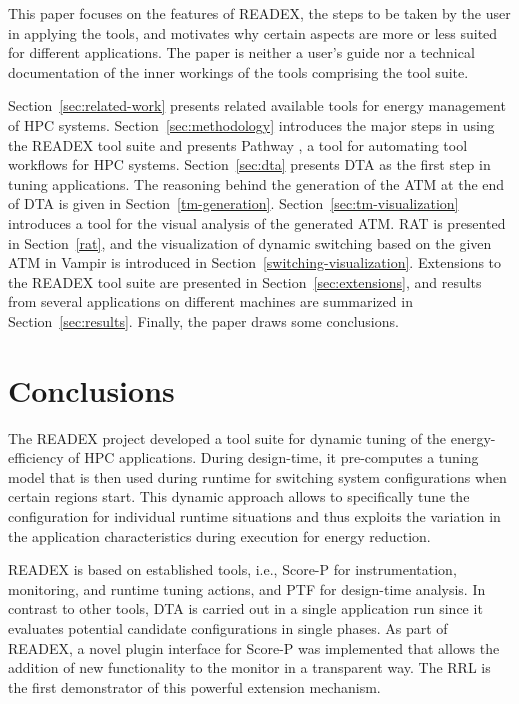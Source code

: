\documentclass[runningheads]{llncs}
\begin{document}
This paper focuses on the features of READEX, the steps to be taken by the user in applying the tools, and motivates why certain aspects are more or less suited for different applications. The paper is neither a user's guide nor a technical documentation of the inner workings of the tools comprising the tool suite. 

Section~\ref{sec:related-work} presents related available tools for energy management of HPC systems. Section~\ref{sec:methodology} introduces the major steps in using the READEX tool suite and presents Pathway \cite{Pathway:Petkov13}, a tool for automating tool workflows for HPC systems. Section~\ref{sec:dta} presents DTA as the first step in tuning applications. The reasoning behind the generation of the ATM at the end of DTA is given in Section~\ref{tm-generation}. Section~\ref{sec:tm-visualization} introduces a tool for the visual analysis of the generated ATM. RAT is presented in Section~\ref{rat}, and the visualization of dynamic switching based on the given ATM in Vampir is introduced in Section~\ref{switching-visualization}. Extensions to the READEX tool suite are presented in Section~\ref{sec:extensions}, and results from several applications on different machines are summarized in Section~\ref{sec:results}. Finally, the paper draws some conclusions. 


















\section{Conclusions} \label{sec:conclusions}

The READEX project developed a tool suite for dynamic tuning of the energy-efficiency of HPC applications. During design-time, it pre-computes a tuning model that is then used during runtime for switching system configurations when certain regions start. This dynamic approach allows to specifically tune the configuration for individual runtime situations and thus exploits the variation in the application characteristics during execution for energy reduction. 

READEX is based on established tools, i.e., Score-P for instrumentation, monitoring, and runtime tuning actions, and PTF for design-time analysis. In contrast to other tools, DTA is carried out in a single application run since it evaluates potential candidate configurations in single phases. As part of READEX, a novel plugin interface for Score-P was implemented that allows the addition of new functionality to the monitor in a transparent way. The RRL is the first demonstrator of this powerful extension mechanism.
\end{document}
